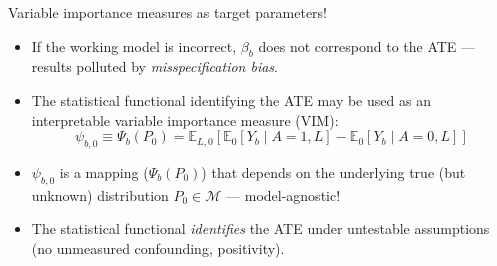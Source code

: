 \documentclass{beamer}
\begin{document}
\begin{frame}[c]{Variable importance measures as target parameters!}

\begin{center}
\begin{itemize}
  \itemsep6pt
  \item If the working model is incorrect, $\beta_b$ does not correspond to the
    ATE --- results polluted by \textit{misspecification bias}.
  \item The statistical functional identifying the ATE may be used as an
    interpretable variable importance measure (VIM):
    $$ \psi_{b,0} \equiv \Psi_b(P_0) = \mathbb{E}_{L,0}[\mathbb{E}_0[Y_b \mid
    A = 1, L] - \mathbb{E}_0[Y_b \mid A = 0, L]] $$
  \item $\psi_{b,0}$ is a mapping ($\Psi_b(P_0)$) that depends on the underlying
    true (but unknown) distribution $P_0 \in \mathcal{M}$ --- model-agnostic!
  \item The statistical functional \textit{identifies} the ATE under untestable
    assumptions (no unmeasured confounding, positivity).
\end{itemize}
\end{center}

\end{frame}

\end{document}
